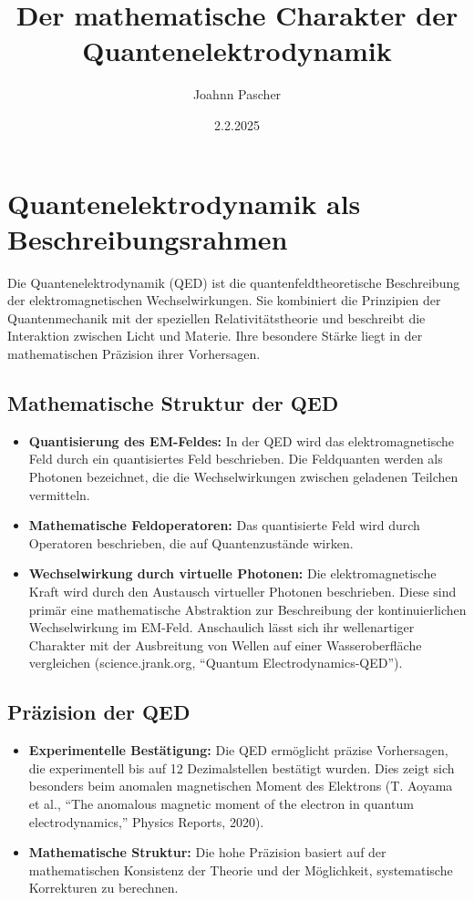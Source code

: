 \documentclass[12pt,a4paper]{article}
\title{Der mathematische Charakter der Quantenelektrodynamik}
\author{Joahnn Pascher}
\date{2.2.2025}
\begin{document}
\maketitle

\section{Quantenelektrodynamik als Beschreibungsrahmen}
Die Quantenelektrodynamik (QED) ist die quantenfeldtheoretische Beschreibung der elektromagnetischen Wechselwirkungen. Sie kombiniert die Prinzipien der Quantenmechanik mit der speziellen Relativitätstheorie und beschreibt die Interaktion zwischen Licht und Materie. Ihre besondere Stärke liegt in der mathematischen Präzision ihrer Vorhersagen.

\subsection{Mathematische Struktur der QED}
\begin{itemize}
\item \textbf{Quantisierung des EM-Feldes:} In der QED wird das elektromagnetische Feld durch ein quantisiertes Feld beschrieben. Die Feldquanten werden als Photonen bezeichnet, die die Wechselwirkungen zwischen geladenen Teilchen vermitteln.
\item \textbf{Mathematische Feldoperatoren:} Das quantisierte Feld wird durch Operatoren beschrieben, die auf Quantenzustände wirken.
\item \textbf{Wechselwirkung durch virtuelle Photonen:} Die elektromagnetische Kraft wird durch den Austausch virtueller Photonen beschrieben. Diese sind primär eine mathematische Abstraktion zur Beschreibung der kontinuierlichen Wechselwirkung im EM-Feld. Anschaulich lässt sich ihr wellenartiger Charakter mit der Ausbreitung von Wellen auf einer Wasseroberfläche vergleichen (science.jrank.org, ``Quantum Electrodynamics-QED'').
\end{itemize}

\subsection{Präzision der QED}
\begin{itemize}
\item \textbf{Experimentelle Bestätigung:} Die QED ermöglicht präzise Vorhersagen, die experimentell bis auf 12 Dezimalstellen bestätigt wurden. Dies zeigt sich besonders beim anomalen magnetischen Moment des Elektrons (T. Aoyama et al., ``The anomalous magnetic moment of the electron in quantum electrodynamics,'' Physics Reports, 2020).
\item \textbf{Mathematische Struktur:} Die hohe Präzision basiert auf der mathematischen Konsistenz der Theorie und der Möglichkeit, systematische Korrekturen zu berechnen.
\end{itemize}
\end{document}
